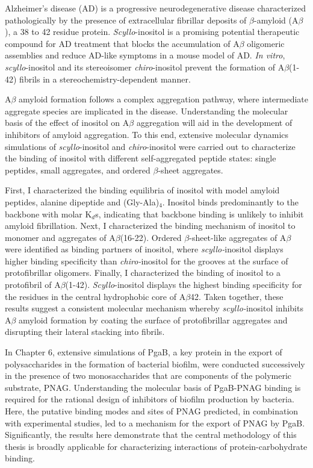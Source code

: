 Alzheimer's disease (AD) is a progressive neurodegenerative disease characterized pathologically by the presence of extracellular fibrillar deposits of $\beta$-amyloid (A$\beta$), a 38 to 42 residue protein. \emph{Scyllo}-inositol is a promising potential therapeutic compound for AD treatment that blocks the accumulation of A$\beta$ oligomeric assemblies and reduce AD-like symptoms in a mouse model of AD. \emph{In vitro}, \emph{scyllo}-inositol and its stereoisomer \emph{chiro}-inositol prevent the formation of A$\beta$(1-42) fibrils in a stereochemistry-dependent manner. 

A$\beta$ amyloid formation follows a complex aggregation pathway, where intermediate aggregate species are implicated in the disease. Understanding the molecular basis of the effect of inositol on A$\beta$ aggregation will aid in the development of inhibitors of amyloid aggregation. To this end, extensive molecular dynamics simulations of \emph{scyllo}-inositol and \emph{chiro}-inositol were carried out to characterize the binding of inositol with different self-aggregated peptide states: single peptides, small aggregates, and ordered $\beta$-sheet aggregates. 

First, I characterized the binding equilibria of inositol with model amyloid peptides, alanine dipeptide and (Gly-Ala)$_4$.  Inositol binds predominantly to the backbone with molar K$_d$s, indicating that backbone binding is unlikely to inhibit amyloid fibrillation. Next, I characterized the binding mechanism of inositol to monomer and aggregates of A$\beta$(16-22). Ordered $\beta$-sheet-like aggregates of A$\beta$ were identified as binding partners of inositol, where \textit{scyllo-}inositol displays higher binding specificity than \textit{chiro-}inositol for the grooves at the surface of protofibrillar oligomers. Finally, I characterized the binding of inositol to a protofibril of A$\beta$(1-42).  \textit{Scyllo}-inositol displays the highest binding specificity for the residues in the central hydrophobic core of A$\beta$42.  Taken together, these results suggest a consistent molecular mechanism whereby \textit{scyllo-}inositol inhibits A$\beta$ amyloid formation by coating the surface of protofibrillar aggregates and disrupting their lateral stacking into fibrils.

In Chapter 6, extensive simulations of PgaB, a key protein in the export of polysaccharides in the formation of bacterial biofilm, were conducted successively in the presence of two monosaccharides that are components of the polymeric substrate, PNAG. Understanding the molecular basis of PgaB-PNAG binding is required for the rational design of inhibitors of biofilm production by bacteria. Here, the putative binding modes and sites of PNAG predicted, in combination with experimental studies, led to a mechanism for the export of PNAG by PgaB. Significantly, the results here demonstrate that the central methodology of this thesis is broadly applicable for characterizing interactions of protein-carbohydrate binding.
